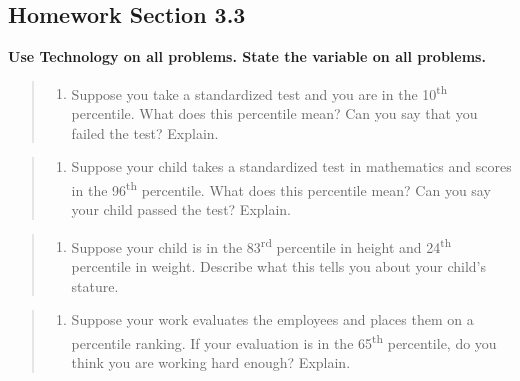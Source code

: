 \documentclass[]{book}
\providecommand{\tightlist}{%
  \setlength{\itemsep}{0pt}\setlength{\parskip}{0pt}}
\begin{document}
\hypertarget{homework-section-3.3}{%
\subsection{Homework Section 3.3}\label{homework-section-3.3}}

\textbf{Use Technology on all problems. State the variable on all problems.}

\begin{quote}
\begin{enumerate}
\def\labelenumi{\arabic{enumi}.}
\tightlist
\item
  Suppose you take a standardized test and you are in the 10\textsuperscript{th} percentile. What does this percentile mean? Can you say that you failed the test? Explain.
\end{enumerate}
\end{quote}

\begin{quote}
\begin{enumerate}
\def\labelenumi{\arabic{enumi}.}
\setcounter{enumi}{1}
\tightlist
\item
  Suppose your child takes a standardized test in mathematics and scores in the 96\textsuperscript{th} percentile. What does this percentile mean? Can you say your child passed the test? Explain.
\end{enumerate}
\end{quote}

\begin{quote}
\begin{enumerate}
\def\labelenumi{\arabic{enumi}.}
\setcounter{enumi}{2}
\tightlist
\item
  Suppose your child is in the 83\textsuperscript{rd} percentile in height and 24\textsuperscript{th} percentile in weight. Describe what this tells you about your child's stature.
\end{enumerate}
\end{quote}

\begin{quote}
\begin{enumerate}
\def\labelenumi{\arabic{enumi}.}
\setcounter{enumi}{3}
\tightlist
\item
  Suppose your work evaluates the employees and places them on a percentile ranking. If your evaluation is in the 65\textsuperscript{th} percentile, do you think you are working hard enough? Explain.
\end{enumerate}
\end{quote}
\end{document}
